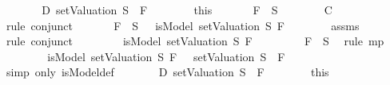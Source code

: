 \begin{isabellebody}
\ \ \ \ \isamarkupfalse%
\ \isamarkupfalse%
\ D{}{\isacharcolon}{\isachardoublequoteopen}{\isasymnot}\ {\isacharparenleft}setValuation\ S{\isacharparenright}\ {\isasymTurnstile}\ F{}{\isachardoublequoteclose}\isanewline
\ \ \ \ \ \ \isamarkupfalse%
\ this\isanewline
\ \ \ \ \isamarkupfalse%
\ {\isachardoublequoteopen}\isactrlbold {\isasymnot}\ F{}\ {\isasymin}\ S{\isachardoublequoteclose}\isanewline
\ \ \ \ \ \ \isamarkupfalse%
\ C\ \isamarkupfalse%
\ {\isacharparenleft}rule\ conjunct{}{\isacharparenright}\isanewline
\ \ \ \ \isamarkupfalse%
\ {\isachardoublequoteopen}\isactrlbold {\isasymnot}\ F{}\ {\isasymin}\ S\ {\isasymlongrightarrow}\ {\isasymnot}\ isModel\ {\isacharparenleft}setValuation\ S{\isacharparenright}\ F{}{\isachardoublequoteclose}\isanewline
\ \ \ \ \ \ \isamarkupfalse%
\ assms{\isacharparenleft}{}{\isacharparenright}\ \isamarkupfalse%
\ {\isacharparenleft}rule\ conjunct{}{\isacharparenright}\isanewline
\ \ \ \ \isamarkupfalse%
\ \isamarkupfalse%
\ {\isachardoublequoteopen}{\isasymnot}\ isModel\ {\isacharparenleft}setValuation\ S{\isacharparenright}\ F{}{\isachardoublequoteclose}\isanewline
\ \ \ \ \ \ \isamarkupfalse%
\ {\isacartoucheopen}\isactrlbold {\isasymnot}\ F{}\ {\isasymin}\ S{\isacartoucheclose}\ \isamarkupfalse%
\ {\isacharparenleft}rule\ mp{\isacharparenright}\isanewline
\ \ \ \ \isamarkupfalse%
\ \isamarkupfalse%
\ {\isachardoublequoteopen}{\isacharparenleft}{\isasymnot}\ isModel\ {\isacharparenleft}setValuation\ S{\isacharparenright}\ F{}{\isacharparenright}\ {\isacharequal}\ {\isacharparenleft}{\isasymnot}\ {\isacharparenleft}setValuation\ S{\isacharparenright}\ {\isasymTurnstile}\ F{}{\isacharparenright}{\isachardoublequoteclose}\isanewline
\ \ \ \ \ \ \isamarkupfalse%
\ {\isacharparenleft}simp\ only{\isacharcolon}\ isModel{\isacharunderscore}def{\isacharparenright}\isanewline
\ \ \ \ \isamarkupfalse%
\ \isamarkupfalse%
\ D{}{\isacharcolon}{\isachardoublequoteopen}{\isasymnot}\ {\isacharparenleft}setValuation\ S{\isacharparenright}\ {\isasymTurnstile}\ F{}{\isachardoublequoteclose}\isanewline
\ \ \ \ \ \ \isamarkupfalse%
\ this\isanewline
\ \ \ \ \isamarkupfalse%

\end{isabellebody}
